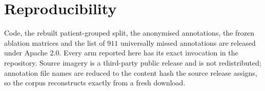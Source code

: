\documentclass[10pt,twocolumn,letterpaper]{article}
\begin{document}



\section*{Reproducibility}

Code, the rebuilt patient-grouped split, the anonymised annotations, the frozen
ablation matrices and the list of $911$ universally missed annotations are
released under Apache 2.0. Every arm reported here has its exact invocation in the
repository. Source imagery is a third-party public release and is not
redistributed; annotation file names are reduced to the content hash the source
release assigns, so the corpus reconstructs exactly from a fresh download.
\end{document}
